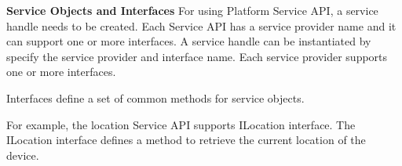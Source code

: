 {\bf Service Objects and Interfaces} \break
For using Platform Service API, a service handle needs to be created. Each Service API has a service provider name and it can support one or more interfaces.  
A service handle can be instantiated by specify the service provider and interface name. Each service provider supports one or more interfaces.

\begin{notice}[note]
Interfaces define a set of common methods for service objects.
\end{notice}

For example, the location Service API supports ILocation interface. The ILocation interface defines a  method to retrieve the current location of the device.
















